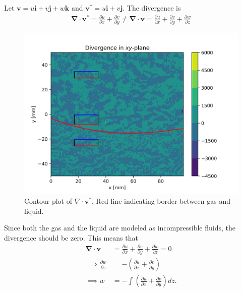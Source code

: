 \documentclass[a4paper,10pt,english]{article}
\begin{document}
\newpage
Let $\bm{v} = u\bm{i} + v\bm{j} + w\bm{k}$ and $\bm{v}^* = u\bm{i} + v\bm{j}$. The divergence is
\begin{align*}
    \mathbf{\nabla} \cdot \bm{v}^*
    = \frac{\partial u}{\partial x} + \frac{\partial v}{\partial y}
    \neq \mathbf{\nabla} \cdot \bm{v}
    = \frac{\partial u}{\partial x} + \frac{\partial v}{\partial y} + \frac{\partial w}{\partial z}
\end{align*}

\begin{figure}[h!]
    \centering
    \includegraphics[scale=0.65]{../figures/task_d.png}
    \caption{Contour plot of $\nabla \cdot \bm{v}^*$. Red line indicating border between gas and liquid.}
    \label{fig:contour_d}
\end{figure}

Since both the gas and the liquid are modeled as incompressible fluids, the divergence should be zero. This means that 
\begin{align*}
    \mathbf{\nabla} \cdot \bm{v}
    &= \frac{\partial u}{\partial x} + \frac{\partial v}{\partial y} + \frac{\partial w}{\partial z}
    = 0 \\
    \implies \frac{\partial w}{\partial z}
    &= - \left(
            \frac{\partial u}{\partial x} + \frac{\partial v}{\partial y}
    \right) \\
    \implies w 
    &= - \int \left(
        \frac{\partial u}{\partial x} + \frac{\partial v}{\partial y}
    \right) dz.
\end{align*}
\end{document}
